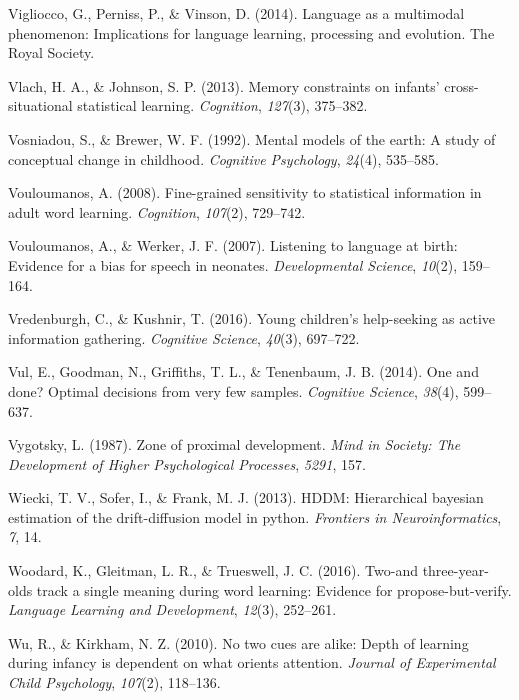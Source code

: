 \documentclass[oneside]{report}
\begin{document}
\hypertarget{ref-vigliocco2014language}{}
Vigliocco, G., Perniss, P., \& Vinson, D. (2014). Language as a
multimodal phenomenon: Implications for language learning, processing
and evolution. The Royal Society.

\hypertarget{ref-vlach2013memory}{}
Vlach, H. A., \& Johnson, S. P. (2013). Memory constraints on infants'
cross-situational statistical learning. \emph{Cognition}, \emph{127}(3),
375--382.

\hypertarget{ref-vosniadou1992mental}{}
Vosniadou, S., \& Brewer, W. F. (1992). Mental models of the earth: A
study of conceptual change in childhood. \emph{Cognitive Psychology},
\emph{24}(4), 535--585.

\hypertarget{ref-vouloumanos2008fine}{}
Vouloumanos, A. (2008). Fine-grained sensitivity to statistical
information in adult word learning. \emph{Cognition}, \emph{107}(2),
729--742.

\hypertarget{ref-vouloumanos2007listening}{}
Vouloumanos, A., \& Werker, J. F. (2007). Listening to language at
birth: Evidence for a bias for speech in neonates. \emph{Developmental
Science}, \emph{10}(2), 159--164.

\hypertarget{ref-vredenburgh2016young}{}
Vredenburgh, C., \& Kushnir, T. (2016). Young children's help-seeking as
active information gathering. \emph{Cognitive Science}, \emph{40}(3),
697--722.

\hypertarget{ref-vul2014}{}
Vul, E., Goodman, N., Griffiths, T. L., \& Tenenbaum, J. B. (2014). One
and done? Optimal decisions from very few samples. \emph{Cognitive
Science}, \emph{38}(4), 599--637.

\hypertarget{ref-vygotsky1987zone}{}
Vygotsky, L. (1987). Zone of proximal development. \emph{Mind in
Society: The Development of Higher Psychological Processes},
\emph{5291}, 157.

\hypertarget{ref-wiecki2013hddm}{}
Wiecki, T. V., Sofer, I., \& Frank, M. J. (2013). HDDM: Hierarchical
bayesian estimation of the drift-diffusion model in python.
\emph{Frontiers in Neuroinformatics}, \emph{7}, 14.

\hypertarget{ref-woodard2016two}{}
Woodard, K., Gleitman, L. R., \& Trueswell, J. C. (2016). Two-and
three-year-olds track a single meaning during word learning: Evidence
for propose-but-verify. \emph{Language Learning and Development},
\emph{12}(3), 252--261.

\hypertarget{ref-wu2010no}{}
Wu, R., \& Kirkham, N. Z. (2010). No two cues are alike: Depth of
learning during infancy is dependent on what orients attention.
\emph{Journal of Experimental Child Psychology}, \emph{107}(2),
118--136.
\end{document}
